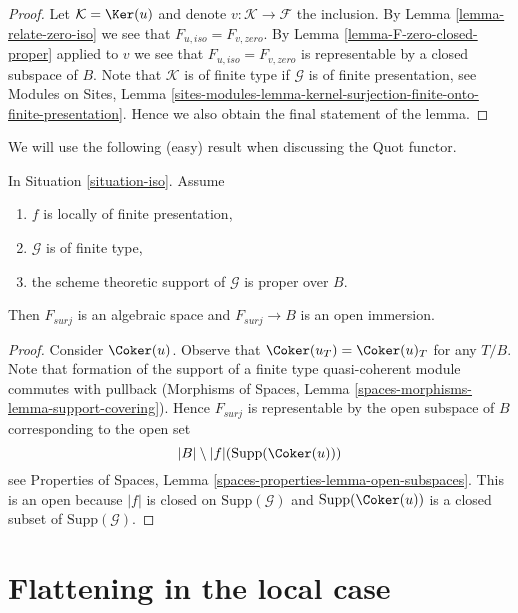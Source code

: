 \begin{proof}
Let $\mathcal{K} = \Ker(u)$ and denote $v : \mathcal{K} \to \mathcal{F}$
the inclusion. By Lemma \ref{lemma-relate-zero-iso} we see that
$F_{u, iso} = F_{v, zero}$. By Lemma \ref{lemma-F-zero-closed-proper}
applied to $v$ we see that $F_{u, iso} = F_{v, zero}$ is representable
by a closed subspace of $B$. Note that $\mathcal{K}$ is of finite type
if $\mathcal{G}$ is of finite presentation, see
Modules on Sites, Lemma
\ref{sites-modules-lemma-kernel-surjection-finite-onto-finite-presentation}.
Hence we also obtain the final statement of the lemma.
\end{proof}

\noindent
We will use the following (easy) result when discussing the Quot functor.

\begin{lemma}
\label{lemma-F-surj-open}
In Situation \ref{situation-iso}. Assume
\begin{enumerate}
\item $f$ is locally of finite presentation,
\item $\mathcal{G}$ is of finite type,
\item the scheme theoretic support of $\mathcal{G}$ is proper over $B$.
\end{enumerate}
Then $F_{surj}$ is an algebraic space and $F_{surj} \to B$
is an open immersion.
\end{lemma}

\begin{proof}
Consider $\Coker(u)$. Observe that
$\Coker(u_T) = \Coker(u)_T$ for any $T/B$.
Note that formation of the support of a finite type
quasi-coherent module commutes with pullback
(Morphisms of Spaces, Lemma \ref{spaces-morphisms-lemma-support-covering}).
Hence $F_{surj}$ is representable by the open subspace of $B$
corresponding to the open set
$$
|B| \setminus |f|(\text{Supp}(\Coker(u)))
$$
see Properties of Spaces, Lemma \ref{spaces-properties-lemma-open-subspaces}.
This is an open because $|f|$ is closed on $\text{Supp}(\mathcal{G})$
and $\text{Supp}(\Coker(u))$ is a closed subset of
$\text{Supp}(\mathcal{G})$.
\end{proof}






\section{Flattening in the local case}
\label{section-flattening-local}


